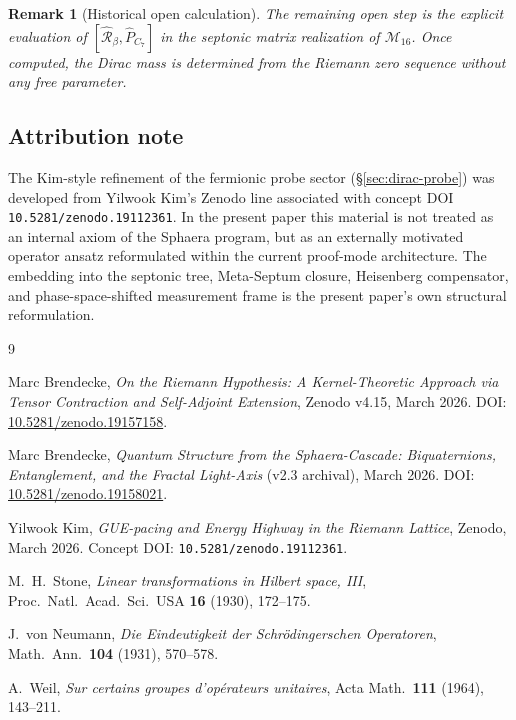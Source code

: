 \documentclass[12pt,a4paper]{article}
\newtheorem*{remark}{Remark}
\begin{document}
\begin{remark}[Historical open calculation]
The remaining open step is the explicit evaluation of
$[\hat{\mathcal{R}}_\beta,\hat P_{C_7}]$ in the septonic matrix
realization of $\mathcal{M}_{16}$.
Once computed, the Dirac mass is determined from the Riemann zero
sequence without any free parameter.
\end{remark}

\subsection*{Attribution note}
\label{app:attribution}

The Kim-style refinement of the fermionic probe sector
(\S\ref{sec:dirac-probe}) was developed from Yilwook Kim's Zenodo line
associated with concept DOI \texttt{10.5281/zenodo.19112361}.
In the present paper this material is not treated as an internal axiom
of the Sphaera program, but as an externally motivated operator ansatz
reformulated within the current proof-mode architecture.
The embedding into the septonic tree, Meta-Septum closure, Heisenberg
compensator, and phase-space-shifted measurement frame is the present
paper's own structural reformulation.



\begin{thebibliography}{9}

Marc Brendecke,
\emph{On the Riemann Hypothesis: A Kernel-Theoretic Approach via
Tensor Contraction and Self-Adjoint Extension},
Zenodo v4.15, March 2026.
\newblock DOI: \href{https://doi.org/10.5281/zenodo.19157158}{10.5281/zenodo.19157158}.

Marc Brendecke,
\emph{Quantum Structure from the Sphaera-Cascade: Biquaternions,
Entanglement, and the Fractal Light-Axis} (v2.3 archival),
March 2026.
\newblock DOI: \href{https://doi.org/10.5281/zenodo.19158021}{10.5281/zenodo.19158021}.

Yilwook Kim,
\emph{GUE-pacing and Energy Highway in the Riemann Lattice},
Zenodo, March 2026.
\newblock Concept DOI: \texttt{10.5281/zenodo.19112361}.

M.~H.~Stone,
\emph{Linear transformations in Hilbert space, III},
Proc.\ Natl.\ Acad.\ Sci.\ USA \textbf{16} (1930), 172--175.

J.~von Neumann,
\emph{Die Eindeutigkeit der Schrödingerschen Operatoren},
Math.\ Ann.\ \textbf{104} (1931), 570--578.

A.~Weil,
\emph{Sur certains groupes d'opérateurs unitaires},
Acta Math.\ \textbf{111} (1964), 143--211.

\end{thebibliography}
\end{document}
